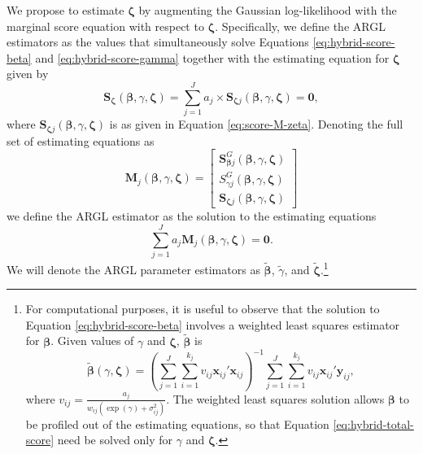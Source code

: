 \documentclass[
  man, donotrepeattitle,floatsintext]{apa7}
\begin{document}
We propose to estimate \(\boldsymbol\zeta\) by augmenting the Gaussian log-likelihood with the marginal score equation with respect to \(\boldsymbol\zeta\).
Specifically, we define the ARGL estimators as the values that simultaneously solve Equations \eqref{eq:hybrid-score-beta} and \eqref{eq:hybrid-score-gamma} together with the estimating equation for \(\boldsymbol\zeta\) given by
\begin{equation}
\label{eq:hybrid-score-zeta}
\mathbf{S}_{\boldsymbol\zeta}\left(\boldsymbol{\beta}, \gamma, \boldsymbol{\zeta}\right) = \sum_{j=1}^J a_j \times \mathbf{S}_{\boldsymbol\zeta j}\left(\boldsymbol{\beta}, \gamma, \boldsymbol{\zeta}\right) = \mathbf{0},
\end{equation}
where \(\mathbf{S}_{\boldsymbol\zeta j}\left(\boldsymbol{\beta}, \gamma, \boldsymbol{\zeta}\right)\) is as given in Equation \eqref{eq:score-M-zeta}.
Denoting the full set of estimating equations as
\begin{equation}
\label{eq:hybrid-score}
\mathbf{M}_j(\boldsymbol\beta, \gamma, \boldsymbol\zeta) = \left[\begin{array}{c} \mathbf{S}^G_{\boldsymbol\beta j}(\boldsymbol\beta, \gamma, \boldsymbol\zeta) \\ S^G_{\gamma j}(\boldsymbol\beta, \gamma, \boldsymbol\zeta) \\ \mathbf{S}_{\boldsymbol\zeta j}(\boldsymbol\beta, \gamma, \boldsymbol\zeta) \end{array}\right]
\end{equation}
we define the ARGL estimator as the solution to the estimating equations
\begin{equation}
\label{eq:hybrid-total-score}
\sum_{j=1}^J a_j \mathbf{M}_j(\boldsymbol\beta, \gamma, \boldsymbol\zeta) = \mathbf{0}.
\end{equation}
We will denote the ARGL parameter estimators as \(\boldsymbol{\tilde\beta}\), \(\tilde\gamma\), and \(\boldsymbol{\tilde\zeta}\).\footnote{For computational purposes, it is useful to observe that the solution to Equation \eqref{eq:hybrid-score-beta} involves a weighted least squares estimator for \(\boldsymbol\beta\). Given values of \(\gamma\) and \(\boldsymbol\zeta\), \(\boldsymbol{\tilde\beta}\) is
  \[
  \boldsymbol{\tilde\beta}(\gamma, \boldsymbol\zeta) = \left(\sum_{j=1}^J \sum_{i=1}^{k_j} v_{ij} \mathbf{x}_{ij}' \mathbf{x}_{ij}\right)^{-1} \sum_{j=1}^J \sum_{i=1}^{k_j} v_{ij} \mathbf{x}_{ij}' \mathbf{y}_{ij},
  \]
  where \(v_{ij} = \frac{a_j}{w_{ij} \left(\exp(\gamma) + \sigma_{ij}^2\right)}\).
  The weighted least squares solution allows \(\boldsymbol\beta\) to be profiled out of the estimating equations, so that Equation \eqref{eq:hybrid-total-score} need be solved only for \(\gamma\) and \(\boldsymbol\zeta\).}
\end{document}
